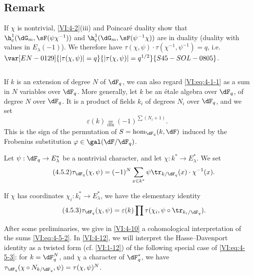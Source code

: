 \subsection{Remark}\label{VI:4-4}

If $\chi$ is nontrivial, \ref{VI:4-2}(iii) and Poincaré duality 
show that $\h_c^1(\dG_m,\sF(\psi\chi^{-1}))$ and 
$\h_c^1(\dG_m,\sF(\psi^{-1}\chi))$ are in duality (duality with values 
in $E_\lambda(-1)$). We therefore have 
$\tau(\chi,\psi)\cdot \tau(\chi^{-1},\psi^{-1}) = q$, i.e. 
$\var[EN-0129]{|\tau(\chi,\psi)|=q}{|\tau(\chi,\psi)|=q^{1/2}}{S45-SOL-0805}$. 





\subsection{}\label{VI:4-5}

If $k$ is an extension of degree $N$ of $\dF_q$, we can also regard 
\eqref{VI:eq:4-1-1} as a sum in $N$ variables over $\dF_q$. More 
generally, let $k$ be an étale algebra over $\dF_q$, of degree $N$ over 
$\dF_q$. It is a product of fields $k_i$ of degrees $N_i$ over $\dF_q$, and we set 
\begin{equation*}\tag{4.5.1}\label{VI:eq:4-5-1}
  \varepsilon(k) \underset{\mathrm{dfn}}{=} (-1)^{\sum (N_i+1)} \text{.} 
\end{equation*}
This is the sign of the permutation of $S=\hom_{\dF_q}(k,\dF)$ induced by the 
Frobenius substitution $\varphi\in \gal(\dF/\dF_q)$. 

Let $\psi:\dF_q\to E_\lambda^\ast$ be a nontrivial character, and let 
$\chi:k^\ast \to E_\lambda^\ast$. We set 
\begin{equation*}\tag{4.5.2}\label{VI:eq:4-5-2}
  \tau_{\dF_q}(\chi,\psi) = (-1)^N \sum_{x\in k^\ast} \psi \tr_{k/\dF_q}(x) \cdot \chi^{-1}(x) \text{.} 
\end{equation*}

If $\chi$ has coordinates $\chi_i:k_i^\ast \to E_\lambda^\ast$, we 
have the elementary identity 
\begin{equation*}\tag{4.5.3}\label{VI:eq:4-5-3}
  \tau_{\dF_q}(\chi,\psi) = \varepsilon(k) \prod \tau(\chi_i,\psi\circ \tr_{k_i/\dF_q}) \text{.}
\end{equation*}

After some preliminaries, we give in \ref{VI:4-10} a 
cohomological interpretation of the sums \eqref{VI:eq:4-5-2}. In 
\ref{VI:4-12}, we will interpret the Hasse--Davenport identity as a 
twisted form (cf. \ref{VI:1-12}) of the following special case of 
\eqref{VI:eq:4-5-3}: for $k=\dF_q^N$, and $\chi$ a character of 
$\dF_q^\ast$, we have 
$\tau_{\dF_q}(\chi\circ N_{k/\dF_q},\psi)=\tau(\chi,\psi)^N$. 





